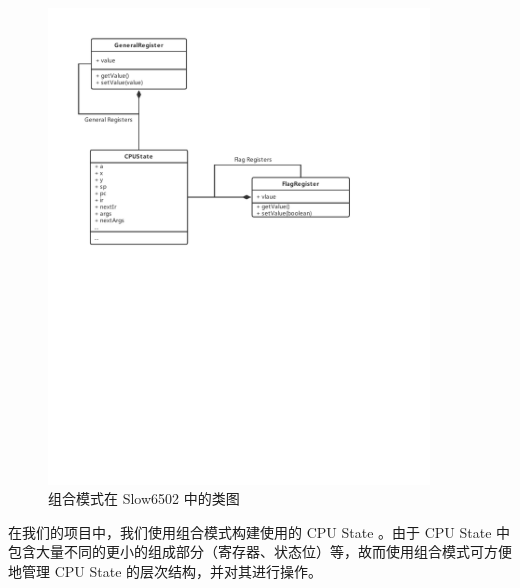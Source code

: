 \begin{figure}[h]
    \centering
    \includegraphics[width=0.9\textwidth]{figures/Composite.pdf}
    \caption{组合模式在 Slow6502 中的类图}
\end{figure}

在我们的项目中，我们使用组合模式构建使用的 CPU State 。由于 CPU State 中包含大量不同的更小的组成部分（寄存器、状态位）等，故而使用组合模式可方便地管理 CPU State 的层次结构，并对其进行操作。

